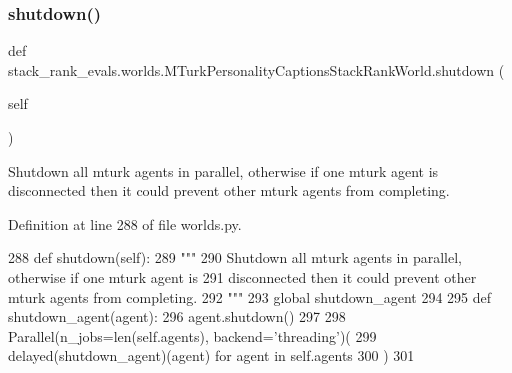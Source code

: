 \mbox{\label{classstack__rank__evals_1_1worlds_1_1MTurkPersonalityCaptionsStackRankWorld_a17e8b57fa31006dcb12852a791a676f9}} 
\subsubsection{\texorpdfstring{shutdown()}{shutdown()}}
{\footnotesize\ttfamily def stack\+\_\+rank\+\_\+evals.\+worlds.\+M\+Turk\+Personality\+Captions\+Stack\+Rank\+World.\+shutdown (\begin{DoxyParamCaption}\item[{}]{self }\end{DoxyParamCaption})}

\begin{DoxyVerb}Shutdown all mturk agents in parallel, otherwise if one mturk agent is
disconnected then it could prevent other mturk agents from completing.
\end{DoxyVerb}
 

Definition at line 288 of file worlds.\+py.


\begin{DoxyCode}
288     \textcolor{keyword}{def }shutdown(self):
289         \textcolor{stringliteral}{"""}
290 \textcolor{stringliteral}{        Shutdown all mturk agents in parallel, otherwise if one mturk agent is}
291 \textcolor{stringliteral}{        disconnected then it could prevent other mturk agents from completing.}
292 \textcolor{stringliteral}{        """}
293         \textcolor{keyword}{global} shutdown\_agent
294 
295         \textcolor{keyword}{def }shutdown\_agent(agent):
296             agent.shutdown()
297 
298         Parallel(n\_jobs=len(self.agents), backend=\textcolor{stringliteral}{'threading'})(
299             delayed(shutdown\_agent)(agent) \textcolor{keywordflow}{for} agent \textcolor{keywordflow}{in} self.agents
300         )
301 \end{DoxyCode}


